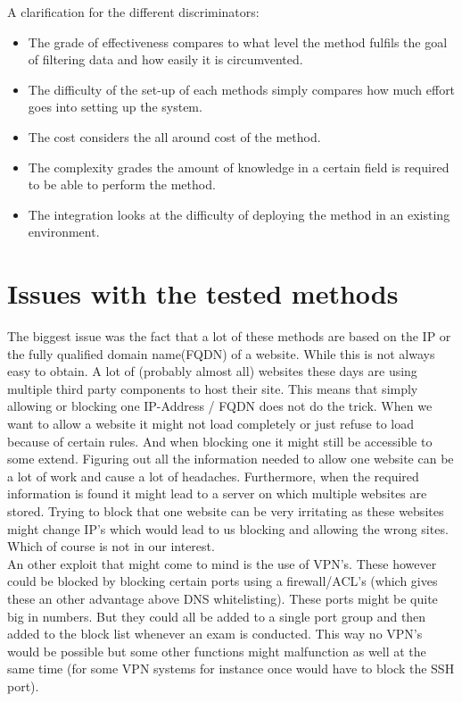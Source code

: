 A clarification for the different discriminators:
\begin{itemize}
	\item The grade of effectiveness compares to what level the method fulfils the goal of filtering data and how easily it is circumvented.
	\item The difficulty of the set-up of each methods simply compares how much effort goes into setting up the system.
	\item The cost considers the all around cost of the method.
	\item The complexity grades the amount of knowledge in a certain field is required to be able to perform the method.
	\item The integration looks at the difficulty of deploying the method in an existing environment. 
\end{itemize}
\section{Issues with the tested methods}
The biggest issue was the fact that a lot of these methods are based on the IP or the fully qualified domain name(FQDN) of a website. While this is not always easy to obtain. A lot of (probably almost all) websites these days are using multiple third party components to host their site. This means that simply allowing or blocking one IP-Address / FQDN does not do the trick. When we want to allow a website it might not load completely or just refuse to load because of certain rules. And when blocking one it might still be accessible to some extend. Figuring out all the information needed to allow one website can be a lot of work and cause a lot of headaches. Furthermore, when the required information is found it might lead to a server on which multiple websites are stored. Trying to block that one website can be very irritating as these websites might change IP's which would lead to us blocking and allowing the wrong sites. Which of course is not in our interest.\\

An other exploit that might come to mind is the use of VPN's. These however could be blocked by blocking certain ports using a firewall/ACL's (which gives these an other advantage above DNS whitelisting). These ports might be quite big in numbers. But they could all be added to a single port group and then added to the block list whenever an exam is conducted. This way no VPN's would be possible but some other functions might malfunction as well at the same time (for some VPN systems for instance once would have to block the SSH port).\\

